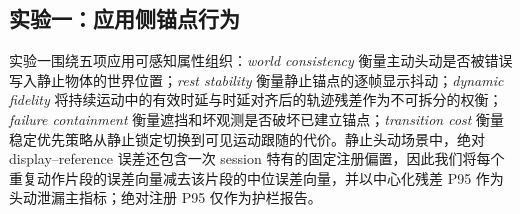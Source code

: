 \documentclass[review]{vgtc}
\begin{document}
\subsection{实验一：应用侧锚点行为}

实验一围绕五项应用可感知属性组织：\emph{world consistency} 衡量主动头动是否被错误写入静止物体的世界位置；\emph{rest stability} 衡量静止锚点的逐帧显示抖动；\emph{dynamic fidelity} 将持续运动中的有效时延与时延对齐后的轨迹残差作为不可拆分的权衡；\emph{failure containment} 衡量遮挡和坏观测是否破坏已建立锚点；\emph{transition cost} 衡量稳定优先策略从静止锁定切换到可见运动跟随的代价。静止头动场景中，绝对 display--reference 误差还包含一次 session 特有的固定注册偏置，因此我们将每个重复动作片段的误差向量减去该片段的中位误差向量，并以中心化残差 P95 作为头动泄漏主指标；绝对注册 P95 仅作为护栏报告。
\end{document}
